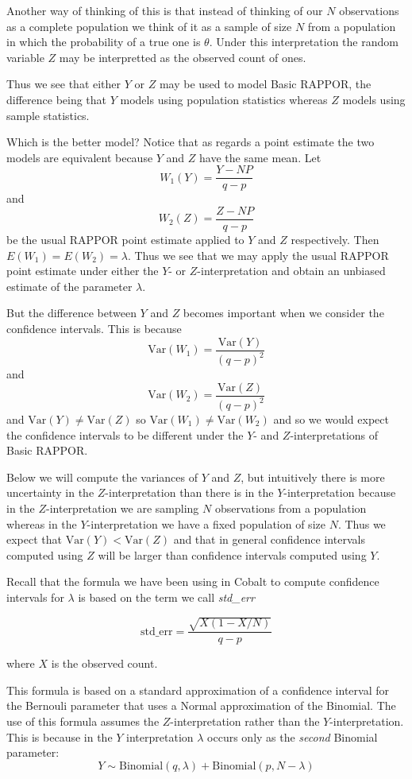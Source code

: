 \documentclass[oneside,12pt]{amsart}
\begin{document}
Another way of thinking of this is that instead of thinking of our $N$ observations
as a complete population we think of it as a sample of size $N$ from a population
in which the probability of a true one is $\theta$. Under this interpretation
the random variable $Z$ may be interpretted as the observed count of ones.

Thus we see that either $Y$ or $Z$ may be used to model Basic RAPPOR, the
difference being that $Y$ models using population statistics whereas $Z$
models using sample statistics.

Which is the better model? Notice that as regards a point estimate the two
models are equivalent because $Y$ and $Z$ have the same mean. Let
$$W_1(Y) = \frac{Y-N P}{q-p}$$
and
$$W_2(Z) = \frac{Z-N P}{q-p}$$
be the usual RAPPOR point estimate applied to $Y$ and $Z$ respectively. Then
$E(W_1) = E(W_2) = \lambda$.  Thus we see that we may apply the usual RAPPOR
point estimate under either the $Y$- or $Z$-interpretation and obtain an
unbiased estimate of the parameter $\lambda$.

But the difference between $Y$ and $Z$ becomes important when we consider
the confidence intervals. This is because
$$\text{Var}(W_1) = \frac{\text{Var}(Y)}{(q-p)^2}$$
and
$$\text{Var}(W_2) = \frac{\text{Var}(Z)}{(q-p)^2}$$
and
$\text{Var}(Y)\not=\text{Var}(Z)$ so $\text{Var}(W_1)\not=\text{Var}(W_2)$
and so we would expect the confidence intervals to be different under
the $Y$- and $Z$-interpretations of Basic RAPPOR.

Below we will compute the variances of $Y$ and $Z$, but intuitively there is
more uncertainty in the $Z$-interpretation than there
is in the $Y$-interpretation because in the $Z$-interpretation we are
sampling $N$ observations from a population whereas in the $Y$-interpretation
we have a fixed population of size $N$. Thus we expect that
$\text{Var}(Y) < \text{Var}(Z)$ and that in general confidence intervals
computed using $Z$ will be larger than confidence intervals computed
using $Y$.

Recall that the formula we have been using in Cobalt to compute
confidence intervals for $\lambda$ is based on the term we call \emph{std\_err}

$$\text{std\_err} = \frac{\sqrt{X  (1 - X/N)}}{q - p}$$

where $X$ is the observed count.

This formula is based on a standard approximation of a confidence interval
for the Bernouli parameter that uses a Normal approximation of the Binomial.
The use of this formula assumes the $Z$-interpretation rather than the
$Y$-interpretation. This is because in the $Y$ interpretation $\lambda$
occurs only as the \emph{second} Binomial parameter:
$$Y\sim\text{Binomial}(q, \lambda) + \text{Binomial}(p, N - \lambda)$$
\end{document}
